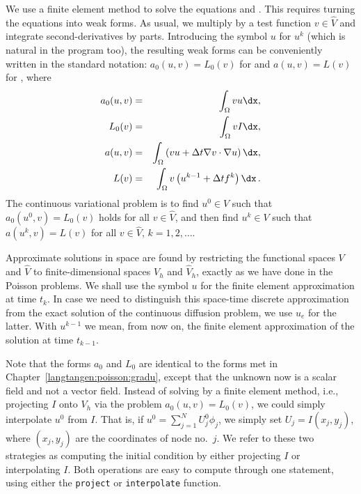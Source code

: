 We use a finite element method
to solve the
equations  and .
This requires turning the equations into weak forms.
As usual, we multiply by a test function $v\in \hat V$ and integrate
second-derivatives by parts. Introducing the symbol $u$ for $u^k$
(which is natural in the program too), the resulting weak
forms can be conveniently written in the standard notation:
$a_0(u,v)=L_0(v)$ for 
and $a(u,v)=L(v)$ for , where
\begin{eqnarray}
a_0(u,v) &=& \int_\Omega vu\dx,\label{langtangen:diffusion:pde1:a0}\\
L_0(v) &=& \int_\Omega vI\dx,\label{langtangen:diffusion:pde1:L0}\\
a(u,v) &=& \int_\Omega\left( vu + \Delta t
\nabla v\cdot\nabla u\right)\dx,\label{langtangen:diffusion:pde1:a}\\
L(v) &=& \int_\Omega v\left(u^{k-1} + \Delta t  f^k\right)\dx\langtangenep
\label{langtangen:diffusion:pde1:L}
\end{eqnarray}
The continuous variational problem is to find
$u^0\in V$ such that $a_0(u^0,v)=L_0(v)$ holds for all $v\in\hat V$,
and then find $u^k\in V$
such that $a(u^k,v)=L(v)$ for all $v\in\hat V$,
$k=1,2,\ldots$.

Approximate solutions in space
are found by
restricting the functional spaces $V$ and $\hat V$
to finite-dimensional spaces
$V_h$ and $\hat V_h$, exactly as we have done in the Poisson problems.
We shall use the symbol $u$ for the finite element
approximation at time $t_k$. In case we need to distinguish this
space-time discrete approximation from the exact solution of
the continuous diffusion problem, we use $u_e$ for the latter.
With $u^{k-1}$ we mean, from now on, the finite element approximation
of the solution at time $t_{k-1}$.

Note that the forms $a_0$ and $L_0$ are identical to the forms
met in Chapter~\ref{langtangen:poisson:gradu}, except that the unknown now
is a scalar field and not a vector field.
Instead of solving  by a finite
element method, i.e., projecting $I$ onto $V_h$ via
the problem $a_0(u,v)=L_0(v)$, we could simply interpolate $u^0$ from
$I$. That is, if $u^0=\sum_{j=1}^N U^0_j\phi_j$, we
simply set $U_j=I(x_j,y_j)$, where $(x_j,y_j)$ are the coordinates of
node no.~$j$. We refer to these two strategies as computing
the initial condition by either projecting $I$ or interpolating $I$.
Both operations are easy to compute through one statement, using either
the {\fontsize{12pt}{12pt}\texttt{project}} or {\fontsize{12pt}{12pt}\texttt{interpolate}} function.


